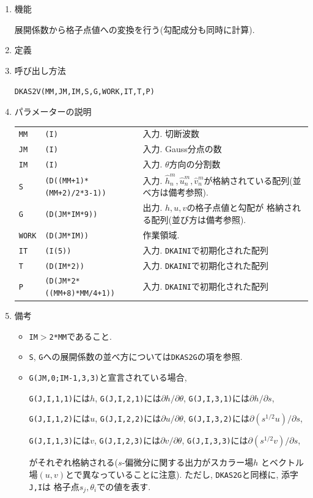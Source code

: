 \documentclass[a4j,fleqn]{jarticle}
\begin{document}
\begin{enumerate}

\item 機能

展開係数から格子点値への変換を行う(勾配成分も同時に計算).

\item 定義

\item 呼び出し方法 
    
{\tt DKAS2V(MM,JM,IM,S,G,WORK,IT,T,P)}
  
\item パラメーターの説明 
    
\begin{tabular}{lll}
{\tt MM} & {\tt (I)} & 入力. 切断波数\\
{\tt JM} & {\tt (I)} & 入力. Gauss分点の数\\
{\tt IM} & {\tt (I)} & 入力. $\theta$方向の分割数\\
{\tt S}   & {\tt (D((MM+1)*(MM+2)/2*3-1))} & 入力. $\hat h^m_n,\hat u^m_n,\hat
v^m_n$が格納されている配列(並べ方は備考参照).\\
{\tt G}   & {\tt (D(JM*IM*9))} & 出力. $h,u,v$の格子点値と勾配が
格納される配列(並び方は備考参照).\\
{\tt WORK}   & {\tt (D(JM*IM))} & 作業領域.\\
{\tt IT}  & {\tt (I(5))}    & 入力. {\tt DKAINI}で初期化された配列\\
{\tt T}   & {\tt (D(IM*2))} & 入力. {\tt DKAINI}で初期化された配列\\
{\tt P}  & {\tt (D(JM*2*((MM+8)*MM/4+1))} & 入力. {\tt DKAINI}で初期化された配列
\end{tabular}

\item 備考

\begin{itemize}

\item {\tt IM}$>${\tt 2*MM}であること.

\item {\tt S}, {\tt G}への展開係数の並べ方については{\tt DKAS2G}の項を参照.

\item {\tt G(JM,0;IM-1,3,3)}と宣言されている場合,

   {\tt G(J,I,1,1)}には$h$,
   {\tt G(J,I,2,1)}には$\partial h/\partial\theta$,
   {\tt G(J,I,3,1)}には$\partial h/\partial s$,
   
   {\tt G(J,I,1,2)}には$u$,
   {\tt G(J,I,2,2)}には$\partial u/\partial\theta$,
   {\tt G(J,I,3,2)}には$\partial (s^{1/2}u)/\partial s$,
   
   {\tt G(J,I,1,3)}には$v$,
   {\tt G(J,I,2,3)}には$\partial v/\partial\theta$,
   {\tt G(J,I,3,3)}には$\partial (s^{1/2}v)/\partial s$,

   がそれぞれ格納される($s$-偏微分に関する出力がスカラー場$h$
   とベクトル場$(u,v)$とで異なっていることに注意).
   ただし, {\tt DKAS2G}と同様に, 添字{\tt J,I}は
   格子点$s_j,\theta_i$での値を表す.

\end{itemize}

\end{enumerate}
\end{document}
